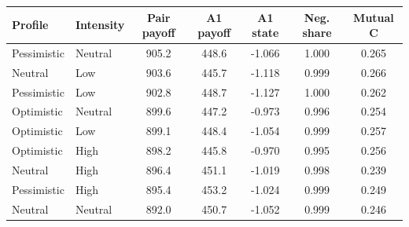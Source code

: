 \begin{tabular}{llccccc}
\toprule
Profile & Intensity & Pair payoff & A1 payoff & A1 state & Neg. share & Mutual C \\ 
\midrule
Pessimistic & Neutral & 905.2 & 448.6 & -1.066 & 1.000 & 0.265 \\ 
Neutral & Low & 903.6 & 445.7 & -1.118 & 0.999 & 0.266 \\ 
Pessimistic & Low & 902.8 & 448.7 & -1.127 & 1.000 & 0.262 \\ 
Optimistic & Neutral & 899.6 & 447.2 & -0.973 & 0.996 & 0.254 \\ 
Optimistic & Low & 899.1 & 448.4 & -1.054 & 0.999 & 0.257 \\ 
Optimistic & High & 898.2 & 445.8 & -0.970 & 0.995 & 0.256 \\ 
Neutral & High & 896.4 & 451.1 & -1.019 & 0.998 & 0.239 \\ 
Pessimistic & High & 895.4 & 453.2 & -1.024 & 0.999 & 0.249 \\ 
Neutral & Neutral & 892.0 & 450.7 & -1.052 & 0.999 & 0.246 \\ 
\bottomrule
\end{tabular}
